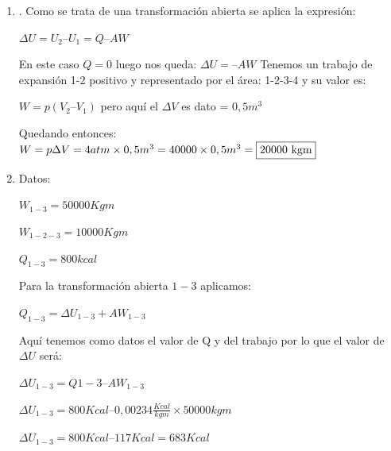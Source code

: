 \documentclass[../main]{subfiles}
\begin{document}
\begin{enumerate}
La cantidad de calor transferida al gas es $Q = 5\ \text{kcal} \cdot 4184\ \text{J/kcal} = 20,920\ \text{J}$

Por lo tanto, la variación de la energía interna del gas es:

$\Delta U = Q - W = 20,920\ \text{J} - 6079.5\ \text{J} = 14,840.5\ \text{J}$

La respuesta en kilocalorías se obtiene dividiendo el resultado en julios entre $4184\ \text{J/kcal}$:

$\Delta U = 14,840.5\ \text{J} / 4184\ \text{J/kcal} = 3.54\ \text{kcal}$

Por lo tanto, la variación de la energía interna del gas cuando es comprimido es de aproximadamente $3.54\ \text{kcal}$.

\item .
Como se trata de una transformación abierta se aplica la expresión:

 $\Delta U = U_2 – U_1 = Q – A W$

En este caso $Q = 0$ luego nos queda: $\Delta U = – A W$
Tenemos un trabajo de expansión 1-2 positivo y representado por el área: 1-2-3-4 y su valor es:

$ W = p ( V_2 – V_1 )$ pero aquí el $\Delta V$ es dato = $0,5 m^3$ 
 
Quedando entonces: 
$W = p \Delta V = 4 atm \times 0,5 m^3 = 40000 \times 0,5 m^3 = \fbox{20000 kgm}$
 

\item 
Datos:

$W_{1-3} = 50000 Kgm$

$W_{1-2-3} = 10000 Kgm$

$Q_{1-3} = 800 kcal$

Para la transformación abierta $1-3$ aplicamos:

 $Q_{1-3} = \Delta U_{1-3} + A W_{1-3}$

Aquí tenemos como datos el valor de Q y del trabajo por lo que el valor de $\Delta U$ será:

 $\Delta U_{1-3} = Q1-3 – A W_{1-3}$
 
 $\Delta U_{1-3} = 800 Kcal – 0,00234\frac{Kcal}{kgm} \times 50000 kgm$
 
 $\Delta U_{1-3} = 800 Kcal – 117 Kcal = 683 Kcal$


\end{enumerate}
\end{document}
